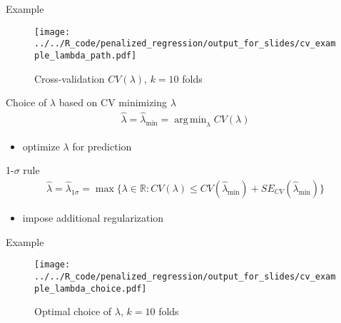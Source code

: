 \documentclass[xcolor=dvipsnames, handout]{beamer}
\DeclareMathOperator{\argmin}{arg\,min}
\begin{document}
\begin{frame}{Example}
  \begin{figure}
  \texttt{[image: ../../R\_code/penalized\_regression/output\_for\_slides/cv\_example\_lambda\_path.pdf]}
   \caption{Cross-validation $CV(\lambda)$, $k = 10$ folds}
\end{figure}
\end{frame}

\begin{frame}{Choice of $\lambda$ based on CV}
minimizing $\lambda$
\begin{align*}
  \hat{\lambda} = \hat{\lambda}_{\min} = \argmin_{\lambda} CV(\lambda)
\end{align*}
\begin{itemize}
  \item optimize $\lambda$ for prediction
\end{itemize}
1-$\sigma$ rule
\begin{align*}
  \hat{\lambda} = \hat{\lambda}_{1\sigma} = \max \{\lambda \in \mathbb{R} : CV(\lambda) \leq CV(\hat{\lambda}_{\min}) +  SE_{CV}(\hat{\lambda}_{\min}) \}
\end{align*}
\begin{itemize}
  \item impose additional regularization
\end{itemize}
\end{frame}

\begin{frame}{Example}
  \begin{figure}
  \texttt{[image: ../../R\_code/penalized\_regression/output\_for\_slides/cv\_example\_lambda\_choice.pdf]}
   \caption{Optimal choice of $\lambda$, $k = 10$ folds}
\end{figure}
\end{frame}

\appendix
\end{document}
